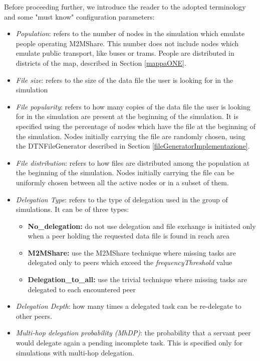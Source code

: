 Before proceeding further, we introduce the reader to the adopted terminology and some "must know" configuration parameters:
\begin{itemize}
\item \textit{Population}: refers to the number of nodes in the simulation which emulate people operating M2MShare. This number does not include nodes which emulate public transport, like buses or trams. People are distributed in districts of the map, described in Section \ref{mappaONE}.

\item \textit{File size}: refers to the size of the data file the user is looking for in the simulation 

\item \textit{File popularity}: refers to how many copies of the data file the user is looking for in the simulation are present at the beginning of the simulation. It is specified using the percentage of nodes which have the file at the beginning of the simulation. Nodes initially carrying the file are randomly chosen, using the DTNFileGenerator described in Section \ref{fileGeneratorImplementazione}.

\item \textit{File distribution}: refers to how files are distributed among the population at the beginning of the simulation. Nodes initially carrying the file can be uniformly chosen between all the active nodes or in a subset of them.

\item \textit{Delegation Type}: refers to the type of delegation used in the group of simulations. It can be of three types:
\begin{itemize}
\item \textbf{No\_delegation:} do not use delegation and file exchange is initiated only when a peer holding the requested data file is found in reach area 
\item \textbf{M2MShare:} use the M2MShare technique where missing tasks are delegated only to peers which exceed the \textit{frequencyThreshold} value
\item \textbf{Delegation\_to\_all:} use the trivial technique where missing tasks are delegated to each encountered peer
\end{itemize}

\item \textit{Delegation Depth}: how many times a delegated task can be re-delegate to other peers.

\item \textit{Multi-hop delegation probability (MhDP)}: the probability that a servant peer would delegate again a pending incomplete task. This is specified only for simulations with multi-hop delegation.


\end{itemize}
